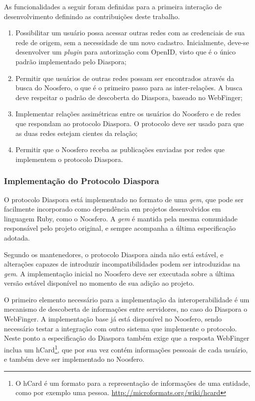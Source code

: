 As funcionalidades a seguir foram definidas para a primeira interação de
desenvolvimento definindo as contribuições deste trabalho.

\begin{enumerate}
  \item{Possibilitar um usuário possa acessar outras redes com as credenciais de sua
        rede de origem, sem a necessidade de um novo cadastro. Inicialmente, deve-se
        desenvolver um \textit{plugin} para autorização com OpenID, visto que é o
        único padrão implementado pelo Diaspora;}

  \item{Permitir que usuários de outras redes possam ser encontrados através da
        busca do Noosfero, o que é o primeiro passo para as inter-relações. A busca
        deve respeitar o padrão de descoberta do Diaspora, baseado no WebFinger;}

  \item{Implementar relações assimétricas entre os usuários do Noosfero e de redes
        que respondam ao protocolo Diaspora. O protocolo deve ser usado para que as
        duas redes estejam cientes da relação;}

  \item{Permitir que o Noosfero receba as publicações enviadas por redes que
        implementem o protocolo Diaspora.}
\end{enumerate}

\subsubsection{Implementação do Protocolo Diaspora}

O protocolo Diaspora está implementado no formato de uma \textit{gem}, que pode ser
facilmente incorporado como dependência em projetos desenvolvidos em linguagem Ruby,
como o Noosfero. A \textit{gem} é mantida pela mesma comunidade responsável pelo
projeto original, e sempre acompanha a última especificação adotada.

Segundo os mantenedores, o protocolo Diaspora ainda não está estável, e alterações
capazes de introduzir incompatibilidades podem ser introduzidas na \textit{gem}. A
implementação inicial no Noosfero deve ser executada sobre a última versão estável
disponível no momento de sua adição ao projeto.

O primeiro elemento necessário para a implementação da interoperabilidade é um
mecanismo de descoberta de informações entre servidores, no caso do Diaspora o
WebFinger. A implementação base já está disponível no Noosfero, sendo necessário
testar a integração com outro sistema que implemente o protocolo. Neste ponto a
especificação do Diaspora também exige que a resposta WebFinger inclua um
hCard\footnote{O hCard é um formato para a representação de informações de uma
entidade, como por exemplo uma pessoa. \url{http://microformats.org/wiki/hcard}},
que por sua vez contém informações pessoais de cada usuário, e também deve ser
implementado no Noosfero.

